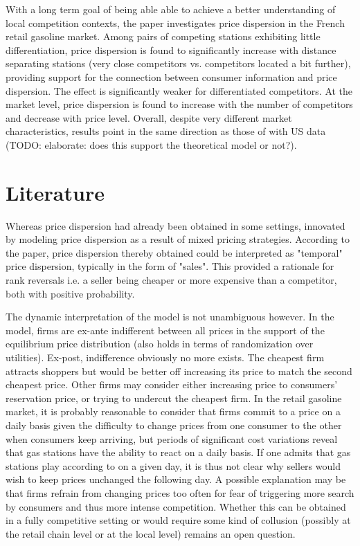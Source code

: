 \documentclass[11pt]{article}
\begin{document}
With a long term goal of being able able to achieve a better understanding of local competition contexts, the paper investigates price dispersion in the French retail gasoline market. Among pairs of competing stations exhibiting little differentiation, price dispersion is found to significantly increase with distance separating stations (very close competitors vs. competitors located a bit further), providing support for the connection between consumer information and price dispersion. The effect is significantly weaker for differentiated competitors. At the market level, price dispersion is found to increase with the number of competitors and decrease with price level. Overall, despite very different market characteristics, results point in the same direction as those of \cite{TAP11} with US data (TODO: elaborate: does this support the theoretical model or not?).

\section{Literature}

Whereas price dispersion had already been obtained in some settings, \cite{VAR80} innovated by modeling price dispersion as a result of mixed pricing strategies. According to the paper, price dispersion thereby obtained could be interpreted as "temporal" price dispersion, typically in the form of "sales". This provided a rationale for rank reversals i.e. a seller being cheaper or more expensive than a competitor, both with positive probability.

The dynamic interpretation of the model is not unambiguous however. In the model, firms are ex-ante indifferent between all prices in the support of the equilibrium price distribution (also holds in terms of randomization over utilities). Ex-post, indifference obviously no more exists. The cheapest firm attracts shoppers but would be better off increasing its price to match the second cheapest price. Other firms may consider either increasing price to consumers' reservation price, or trying to undercut the cheapest firm. In the retail gasoline market, it is probably reasonable to consider that firms commit to a price on a daily basis given the difficulty to change prices from one consumer to the other when consumers keep arriving, but periods of significant cost variations reveal that gas stations have the ability to react on a daily basis. If one admits that gas stations play according to \cite{VAR80} on a given day, it is thus not clear why sellers would wish to keep prices unchanged the following day. A possible explanation may be that firms refrain from changing prices too often for fear of triggering more search by consumers and thus more intense competition. Whether this can be obtained in a fully competitive setting  or would require some kind of collusion (possibly at the retail chain level or at the local level) remains an open question.
\end{document}
